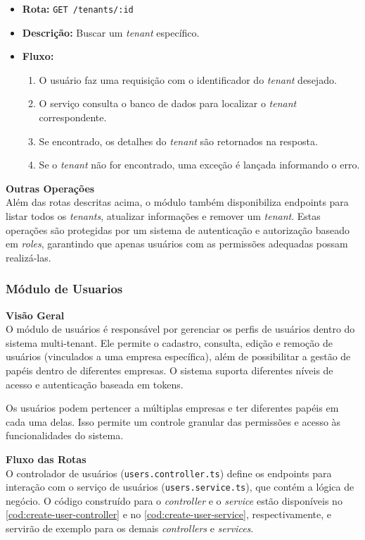 \begin{itemize}
	\item \textbf{Rota:} \texttt{GET /tenants/:id}
	\item \textbf{Descrição:} Buscar um \textit{tenant} específico.
	\item \textbf{Fluxo:}
	\begin{enumerate}
    \item O usuário faz uma requisição com o identificador do \textit{tenant} desejado.
    \item O serviço consulta o banco de dados para localizar o \textit{tenant} correspondente.
    \item Se encontrado, os detalhes do \textit{tenant} são retornados na resposta.
    \item Se o \textit{tenant} não for encontrado, uma exceção é lançada informando o erro.
	\end{enumerate}
\end{itemize}

\textbf{Outras Operações} \\
Além das rotas descritas acima, o módulo também disponibiliza endpoints para listar todos os \textit{tenants}, atualizar informações e remover um \textit{tenant}. Estas operações são protegidas por um sistema de autenticação e autorização baseado em \textit{roles}, garantindo que apenas usuários com as permissões adequadas possam realizá-las.

\subsubsection{Módulo de Usuarios}\label{subsubsec:modulo_usuarios}

\textbf{Visão Geral}\\
O módulo de usuários é responsável por gerenciar os perfis de usuários dentro do sistema multi-tenant. Ele permite o cadastro, consulta, edição e remoção de usuários (vinculados a uma empresa específica), além de possibilitar a gestão de papéis dentro de diferentes empresas. O sistema suporta diferentes níveis de acesso e autenticação baseada em tokens.

Os usuários podem pertencer a múltiplas empresas e ter diferentes papéis em cada uma delas. Isso permite um controle granular das permissões e acesso às funcionalidades do sistema.

\textbf{Fluxo das Rotas}\\
O controlador de usuários (\texttt{users.controller.ts}) define os endpoints para interação com o serviço de usuários (\texttt{users.service.ts}), que contém a lógica de negócio. O código construído para o \textit{controller} e  o \textit{service} estão disponíveis no \autoref{cod:create-user-controller} e  no \autoref{cod:create-user-service}, respectivamente, e servirão de exemplo para os demais \textit{controllers} e \textit{services}.


